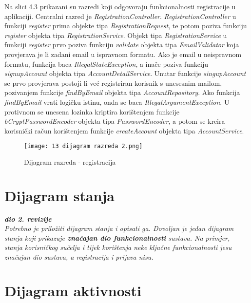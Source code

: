 			Na slici 4.3 prikazani su razredi koji odgovoraju funkcionalnosti registracije u aplikaciji. Centralni razred je \textit{RegistrationController}. \textit{RegistrationController} u funkciji \textit{register} prima objekte tipa \textit{RegistrationRequest}, te potom poziva funkciju \textit{register} objekta tipa \textit{RegistrationService}. Objekt tipa \textit{RegistrationService} u funkciji \textit{register} prvo poziva funkciju \textit{validate} objekta tipa \textit{EmailValidator} koja provjerava je li zadani email u ispravnom formatu. Ako je email u neispravnom formatu, funkcija baca \textit{IllegalStateException}, a inače poziva funkciju \textit{signupAccount} objekta tipa \textit{AccountDetailService}. Unutar funkcije \textit{singupAccount} se prvo provjerava postoji li već registriran korisnik s unesesnim mailom, pozivanjem funkcije \textit{findByEmail} objekta tipa \textit{AccountRepository}. Ako funkcija \textit{findByEmail} vrati logičku istinu, onda se baca \textit{IllegalArgumentException}. U protivnom se unesena lozinka kriptira korištenjem funkcije \textit{bCryptPasswordEncoder} objekta tipa \textit{PasswordEncoder}, a potom se kreira korisnički račun korištenjem funkcije \textit{createAccount} objekta tipa \textit{AccountService}.
			
			\begin{figure}[H]
		\centering
		\texttt{[image: 13 dijagram razreda 2.png]}
		\caption{Dijagram razreda - registracija}
		\end{figure}
		
			\eject
		
		\section{Dijagram stanja}
			
			
			\textbf{\textit{dio 2. revizije}}\\
			
			\textit{Potrebno je priložiti dijagram stanja i opisati ga. Dovoljan je jedan dijagram stanja koji prikazuje \textbf{značajan dio funkcionalnosti} sustava. Na primjer, stanja korisničkog sučelja i tijek korištenja neke ključne funkcionalnosti jesu značajan dio sustava, a registracija i prijava nisu. }
			
			
			\eject 
		
		\section{Dijagram aktivnosti}
		
